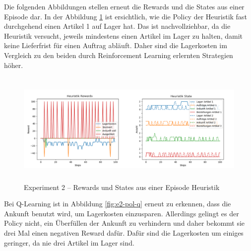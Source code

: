 Die folgenden Abbildungen stellen erneut die Rewards und die States aus einer Episode dar. In der Abbildung \ref{fig:e2-pol-heu} ist ersichtlich, wie die Policy der Heuristik fast durchgehend einen Artikel 1 auf Lager hat. Das ist nachvollziehbar, da die Heuristik versucht, jeweils mindestens einen Artikel im Lager zu halten, damit keine Lieferfrist für einen Auftrag abläuft. Daher sind die Lagerkosten im Vergleich zu den beiden durch Reinforcement Learning erlernten Strategien höher.

\begin{figure}[H]
\centering
  \includegraphics[height=5.5cm]{img/plots/exp-2/heu-rew-state.png}
  \caption{Experiment 2 – Rewards und States aus einer Episode Heuristik}
    \label{fig:e2-pol-heu}
\end{figure}
\newpage
Bei Q-Learning ist in Abbildung \ref{fig:e2-pol-q} erneut zu erkennen, dass die Ankunft benutzt wird, um Lagerkosten einzusparen. Allerdings gelingt es der Policy nicht, ein Überfüllen der Ankunft zu verhindern und daher bekommt sie drei Mal einen negativen Reward dafür. Dafür sind die Lagerkosten um einiges geringer, da nie drei Artikel im Lager sind. 

